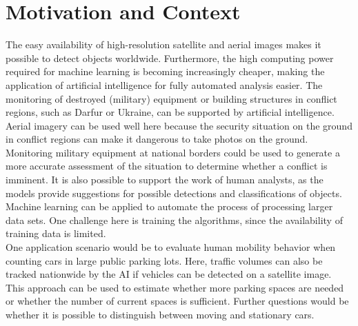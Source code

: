 \documentclass[a4paper,11pt,pdftex, parskip]{scrreprt}
\begin{document}
    





    \section*{Motivation and Context}
    The easy availability of high-resolution satellite and aerial images makes it possible to detect objects worldwide. Furthermore, the high computing power required for machine learning is becoming increasingly cheaper, making the application of artificial intelligence for fully automated analysis easier.
    The monitoring of destroyed (military) equipment or building structures in conflict regions, such as Darfur \cite{Knoth2017} or Ukraine, can be supported by artificial intelligence. Aerial imagery can be used well here because the security situation on the ground in conflict regions can make it dangerous to take photos on the ground. \\
    Monitoring military equipment at national borders could be used to generate a more accurate assessment of the situation to determine whether a conflict is imminent. It is also possible to support the work of human analysts, as the models provide suggestions for possible detections and classifications of objects. \\
    Machine learning can be applied to automate the process of processing larger data sets. One challenge here is training the algorithms, since the availability of training data is limited.\\

    One application scenario would be to evaluate human mobility behavior when counting cars in large public parking lots. Here, traffic volumes can also be tracked nationwide by the AI if vehicles can be detected on a satellite image. This approach can be used to estimate whether more parking spaces are needed or whether the number of current spaces is sufficient. Further questions would be whether it is possible to distinguish between moving and stationary cars. 
\end{document}
